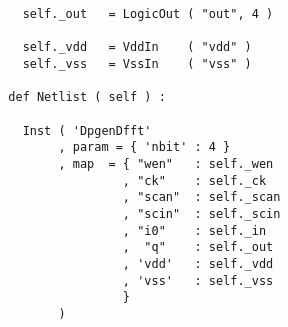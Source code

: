 \begin{itemize}
\begin{verbatim}
    self._out   = LogicOut ( "out", 4 )

    self._vdd   = VddIn    ( "vdd" )
    self._vss   = VssIn    ( "vss" )
    
  def Netlist ( self ) :
      
    Inst ( 'DpgenDfft'
         , param = { 'nbit' : 4 }
         , map  = { "wen"   : self._wen
                  , "ck"    : self._ck
                  , "scan"  : self._scan
                  , "scin"  : self._scin
                  , "i0"    : self._in
                  ,  "q"    : self._out
                  , 'vdd'   : self._vdd
                  , 'vss'   : self._vss
                  }
         )
\end{verbatim}
\end{itemize}
